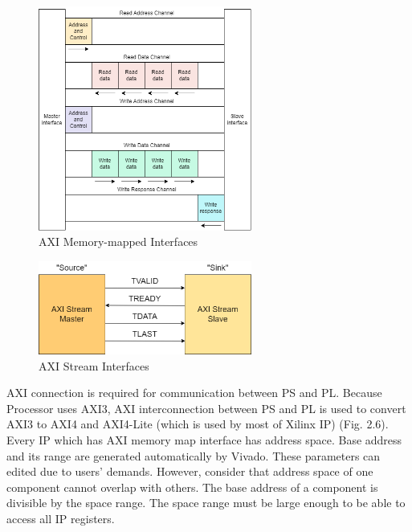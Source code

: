 \documentclass[a4paper, 12pt]{report}
\begin{document}
\begin{center}
    \begin{figure}[H]
        \begin{center}
            \includegraphics[width=7cm]{picture/AXI/AXI.drawio (1).png}
        \end{center}
        \caption{AXI Memory-mapped Interfaces}
        \label{ref Figure}
    \end{figure}
\end{center}
\begin{center}
    \begin{figure}[H]
        \begin{center}
            \includegraphics[width=7cm]{picture/AXI/AXI.drawio.png}
        \end{center}
        \caption{AXI Stream Interfaces}
        \label{ref Figure}
    \end{figure}
\end{center}

AXI connection is required for communication between PS and PL. Because Processor uses AXI3, AXI interconnection between PS and PL is used to convert AXI3 to AXI4 and AXI4-Lite (which is used by most of Xilinx IP) (Fig. 2.6). Every IP which has AXI memory map interface has address space. Base address and its range are generated automatically by Vivado. These parameters can edited due to users' demands. However, consider that address space of one component cannot overlap with others. The base address of a component is divisible by the space range. The space range must be large enough to be able to access all IP registers.
\end{document}
